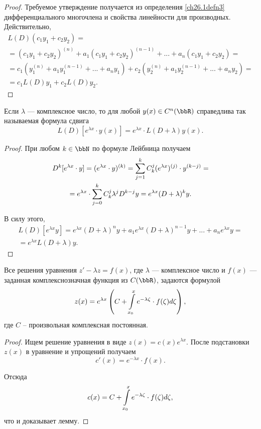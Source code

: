 \begin{proof}
Требуемое утверждение получается из определения \ref{ch26.1defn3} дифференциального многочлена и свойства линейности для производных. Действительно,
\begin{multline*}
L(D)(c_1y_1+c_2y_2)=\\=(c_1y_1+c_2y_2)^{(n)}+a_1(c_1y_1+c_2y_2)^{(n-1)}+...+a_n(c_1y_1+c_2y_2)=\\=c_1(y_1^{(n)}+a_1y_1^{(n-1)}+...+a_ny_1)+c_2(y_2^{(n)}+a_1y_2^{(n-1)}+...+a_ny_2)=\\=c_1L(D)y_1+c_2L(D)y_2. \tag*{$\qedhere$}
\end{multline*}
\end{proof}

\begin{lemm} \label{ch26lemm1.2}
Если $\lambda$ --- комплексное число, то для любой $y(x)\in C^n(\bbR)$ справедлива так называемая формула сдвига
$$
L(D)\left[e^{\lambda x}\cdot y(x)\right]=e^{\lambda x}\cdot L(D+\lambda)y(x).
$$
\end{lemm}
\begin{proof}
При любом $k\in \bbN$ по формуле Лейбница получаем
\begin{multline*}
D^k[e^{\lambda x}\cdot y]=(e^{\lambda x}\cdot y)^{(k)}=\sum_{j=1}^{k}\limits C_k^j(e^{\lambda x})^{(j)}\cdot y^{(k-j)}=\\=e^{\lambda x}\cdot \sum_{j=0}^{k}\limits C_k^j\lambda^jD^{k-j}y=e^{\lambda x}(D+\lambda)^ky.
\end{multline*}

В силу этого,
\begin{multline*}
L(D)[e^{\lambda x}y]=e^{\lambda x}(D+\lambda)^ny+a_1e^{\lambda x}(D+\lambda)^{n-1}y+...+a_ne^{\lambda x}y=\\=e^{\lambda x}L(D+\lambda)y.\tag*{$\qedhere$}
\end{multline*}
\end{proof}

\begin{lemm} \label{ch26lemm1.3}
Все решения уравнения $z'-\lambda z = f(x)$, где $\lambda$ --- комплексное число и $f(x)$ --- заданная комплекснозначная функция из $C(\bbR)$, задаются формулой	
$$
z(x)=e^{\lambda x}\left(C+ \int_{x_0}^{x}\limits e^{-\lambda\zeta}\cdot f(\zeta)d\zeta\right),
$$
где $C$ -- произвольная комплексная постоянная. 
\end{lemm}

\begin{proof}
Ищем решение уравнения в виде $z(x)=c(x)e^{\lambda x}$. После подстановки $z(x)$ в уравнение и упрощений получаем 
$$
c'(x)=e^{-\lambda x}\cdot f(x).
$$

Отсюда
$$
c(x)=C+\int_{x_0}^{x}\limits e^{-\lambda\zeta}\cdot f(\zeta)d\zeta,
$$
что и доказывает лемму.
\end{proof}

